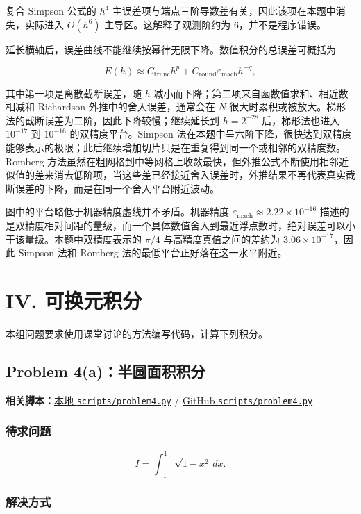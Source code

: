 \documentclass[12pt,a4paper,fontset=none]{ctexart}
\newcommand{\fileinline}[1]{{\urlstyle{same}\nolinkurl{#1}}}
\newcommand{\metadataline}[1]{#1}
\newcommand{\scriptpath}[1]{\fileinline{#1}}
\newcommand{\githubscriptsbase}{https://github.com/Void0312Aurora/computational-physics-homework-2026/blob/main/07/scripts}
\newcommand{\scriptlink}[1]{\noindent\metadataline{\textbf{相关脚本：}\href{../../../scripts/#1}{本地 \scriptpath{scripts/#1}} / \href{\githubscriptsbase/#1}{GitHub \scriptpath{scripts/#1}}}\par\medskip}
\begin{document}
复合 Simpson 公式的 \(h^4\) 主误差项与端点三阶导数差有关，因此该项在本题中消失，实际进入 \(O(h^6)\) 主导区。这解释了观测阶约为 \(6\)，并不是程序错误。

延长横轴后，误差曲线不能继续按幂律无限下降。数值积分的总误差可概括为

\[
E(h)\approx C_{\mathrm{trunc}}h^p+C_{\mathrm{round}}\varepsilon_{\mathrm{mach}}h^{-q},
\]

其中第一项是离散截断误差，随 \(h\) 减小而下降；第二项来自函数值求和、相近数相减和 Richardson 外推中的舍入误差，通常会在 \(N\) 很大时累积或被放大。梯形法的截断误差为二阶，因此下降较慢；继续延长到 \(h=2^{-28}\) 后，梯形法也进入 \(10^{-17}\) 到 \(10^{-16}\) 的双精度平台。Simpson 法在本题中呈六阶下降，很快达到双精度能够表示的极限；此后继续增加切片只是在重复得到同一个或相邻的双精度数。Romberg 方法虽然在粗网格到中等网格上收敛最快，但外推公式不断使用相邻近似值的差来消去低阶项，当这些差已经接近舍入误差时，外推结果不再代表真实截断误差的下降，而是在同一个舍入平台附近波动。

图中的平台略低于机器精度虚线并不矛盾。机器精度 \(\varepsilon_{\mathrm{mach}}\approx2.22\times10^{-16}\) 描述的是双精度相对间距的量级，而一个具体数值舍入到最近浮点数时，绝对误差可以小于该量级。本题中双精度表示的 \(\pi/4\) 与高精度真值之间的差约为 \(3.06\times10^{-17}\)，因此 Simpson 法和 Romberg 法的最低平台正好落在这一水平附近。

\section*{IV. 可换元积分}\label{iv.-ux53efux6362ux5143ux79efux5206}

本组问题要求使用课堂讨论的方法编写代码，计算下列积分。

\subsection{Problem 4(a)：半圆面积积分}\label{problem-4a}

\scriptlink{problem4.py}

\subsubsection{待求问题}\label{ux5f85ux6c42ux95eeux9898-7}

\[
I=\int_{-1}^{1}\sqrt{1-x^2}\,dx.
\]

\subsubsection{解决方式}\label{ux89e3ux51b3ux65b9ux5f0f-7}
\end{document}
